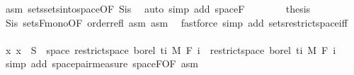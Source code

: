 \begin{isabellebody}
\ asm\ sets{\isachardot}{\kern0pt}sets{\isacharunderscore}{\kern0pt}into{\isacharunderscore}{\kern0pt}space{\isacharbrackleft}{\kern0pt}OF\ S{\isacharunderscore}{\kern0pt}is{\isacharparenleft}{\kern0pt}{}{\isacharparenright}{\kern0pt}{\isacharbrackright}{\kern0pt}\ \isamarkupfalse%
\ {\isacharparenleft}{\kern0pt}auto\ simp\ add{\isacharcolon}{\kern0pt}\ space{\isacharunderscore}{\kern0pt}F{\isacharparenright}{\kern0pt}\isanewline
\ \ \ \ \ \ \isamarkupfalse%
\ {\isacharquery}{\kern0pt}thesis\ \isamarkupfalse%
\ S{\isacharunderscore}{\kern0pt}is{\isacharparenleft}{\kern0pt}{}{\isacharparenright}{\kern0pt}\ sets{\isacharunderscore}{\kern0pt}F{\isacharunderscore}{\kern0pt}mono{\isacharbrackleft}{\kern0pt}OF\ order{\isacharunderscore}{\kern0pt}refl\ asm{\isacharbrackright}{\kern0pt}\ asm\ \isamarkupfalse%
\ {\isacharparenleft}{\kern0pt}fastforce\ simp\ add{\isacharcolon}{\kern0pt}\ sets{\isacharunderscore}{\kern0pt}restrict{\isacharunderscore}{\kern0pt}space{\isacharunderscore}{\kern0pt}iff{\isacharparenright}{\kern0pt}\isanewline
\ \ \ \ \isamarkupfalse%
\isanewline
\ \ \ \ \isamarkupfalse%
\ {\isachardoublequoteopen}{\isacharparenleft}{\kern0pt}{\isasymlambda}x{\isachardot}{\kern0pt}\ x{\isacharparenright}{\kern0pt}\ {\isacharminus}{\kern0pt}{\isacharbackquote}{\kern0pt}\ S\ {\isasyminter}\ space\ {\isacharparenleft}{\kern0pt}restrict{\isacharunderscore}{\kern0pt}space\ borel\ {\isacharbraceleft}{\kern0pt}ti{\isacharbraceright}{\kern0pt}\ {\isasymOtimes}\isactrlsub M\ F\ i{\isacharparenright}{\kern0pt}\ {\isasymin}\ restrict{\isacharunderscore}{\kern0pt}space\ borel\ {\isacharbraceleft}{\kern0pt}ti{\isacharbraceright}{\kern0pt}\ {\isasymOtimes}\isactrlsub M\ F\ i{\isachardoublequoteclose}\ \isamarkupfalse%
\ {\isacharparenleft}{\kern0pt}simp\ add{\isacharcolon}{\kern0pt}\ space{\isacharunderscore}{\kern0pt}pair{\isacharunderscore}{\kern0pt}measure\ space{\isacharunderscore}{\kern0pt}F{\isacharbrackleft}{\kern0pt}OF\ asm{\isacharbrackright}{\kern0pt}{\isacharparenright}{\kern0pt}\isanewline
\ \ \isacommand{{\isacharbraceright}{\kern0pt}}\isamarkupfalse%
\isanewline
\ \ \isamarkupfalse%
\ \isamarkupfalse%

\end{isabellebody}
